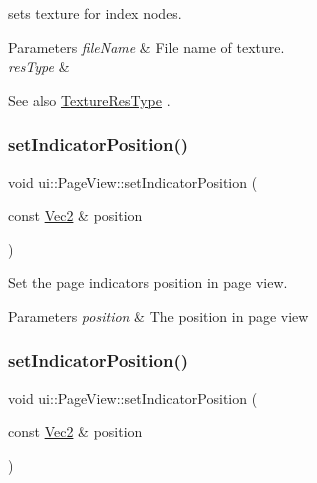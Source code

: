 sets texture for index nodes.


\begin{DoxyParams}{Parameters}
{\em file\+Name} & File name of texture. \\
\hline
{\em res\+Type} & \\
\hline
\end{DoxyParams}
\begin{DoxySeeAlso}{See also}
\hyperlink{classui_1_1Widget_a040a65ec5ad3b11119b7e16b98bd9af0}{Texture\+Res\+Type} . 
\end{DoxySeeAlso}
\mbox{\label{classui_1_1PageView_abcc7b971a29ec68732a8e30a293b8018}} 
\subsubsection{\texorpdfstring{set\+Indicator\+Position()}{setIndicatorPosition()}\hspace{0.1cm}{\footnotesize\ttfamily [1/2]}}
{\footnotesize\ttfamily void ui\+::\+Page\+View\+::set\+Indicator\+Position (\begin{DoxyParamCaption}\item[{const \hyperlink{classVec2}{Vec2} \&}]{position }\end{DoxyParamCaption})}



Set the page indicator\textquotesingle{}s position in page view. 


\begin{DoxyParams}{Parameters}
{\em position} & The position in page view \\
\hline
\end{DoxyParams}
\mbox{\label{classui_1_1PageView_abcc7b971a29ec68732a8e30a293b8018}} 
\subsubsection{\texorpdfstring{set\+Indicator\+Position()}{setIndicatorPosition()}\hspace{0.1cm}{\footnotesize\ttfamily [2/2]}}
{\footnotesize\ttfamily void ui\+::\+Page\+View\+::set\+Indicator\+Position (\begin{DoxyParamCaption}\item[{const \hyperlink{classVec2}{Vec2} \&}]{position }\end{DoxyParamCaption})}



